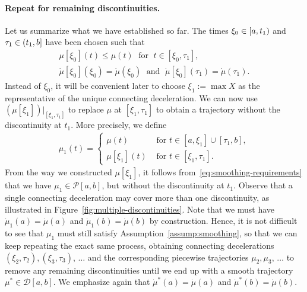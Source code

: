 \documentclass[a4paper]{article}
\theoremstyle{definition}
\theoremstyle{plain}
\begin{document}
\paragraph{Repeat for remaining discontinuities.}
Let us summarize what we have established so far.
%
The times $\xi_{0} \in [a,t_{1})$ and
$\tau_{1} \in (t_{1},b]$ have been chosen such that
\begin{subequations}\label{eq:smoothing-requirements}
\begin{gather}
  \mu[\xi_{0}](t) \leq \mu(t) \; \text{ for } \; t \in [\xi_{0}, \tau_{1}] , \\
  \dot{\mu}[\xi_{0}](\xi_{0}) = \dot{\mu}(\xi_{0}) \; \text{ and } \; \dot{\mu}[\xi_{0}](\tau_{1}) = \dot{\mu}(\tau_{1}) .
\end{gather}
\end{subequations}
Instead of $\xi_{0}$, it will be convenient later to choose $\xi_{1} := \max X$
as the representative of the unique connecting deceleration.
%
We can now use $(\mu[\xi_{1}])|_{[\xi_{1},\tau_{1}]}$ to replace $\mu$ at $[\xi_{1}, \tau_{1}]$ to
obtain a trajectory without the discontinuity at $t_{1}$. More precisely, we
define
\begin{align}
  \mu_{1}(t) =
  \begin{cases}
    \mu(t) &\text{ for } t \in [a, \xi_{1}] \cup [\tau_{1}, b] , \\
    \mu[\xi_{1}](t) &\text{ for } t \in [\xi_{1}, \tau_{1}] .
  \end{cases}
\end{align}
From the way we constructed $\mu[\xi_{1}]$, it follows
from~\eqref{eq:smoothing-requirements} that we have
$\mu_{1} \in \mathcal{P}[a,b]$, but without the discontinuity at $t_{1}$.
%
Observe that a single connecting deceleration may cover more than one
discontinuity, as illustrated in Figure~\ref{fig:multiple-discontinuities}.
%
Note that we must have $\dot{\mu}_{1}(a) = \dot{\mu}(a)$ and
$\dot{\mu}_{1}(b) = \dot{\mu}(b)$ by construction.
%
Hence, it is not difficult to see that $\mu_{1}$ must still satisfy
Assumption~\ref{assump:smoothing}, so that we can keep repeating the exact same
process, obtaining connecting decelerations $(\xi_{2}, \tau_2), (\xi_{3}, \tau_{3}), \,\dots$
and the corresponding piecewise trajectories $\mu_{2}, \mu_{3}, \,\dots$ to remove any
remaining discontinuities until we end up with a smooth trajectory
$\mu^{*} \in \mathcal{D}[a,b]$.
%
We emphasize again that $\dot{\mu}^{*}(a) = \dot{\mu}(a)$ and
$\dot{\mu}^{*}(b) = \dot{\mu}(b)$.
\end{document}
